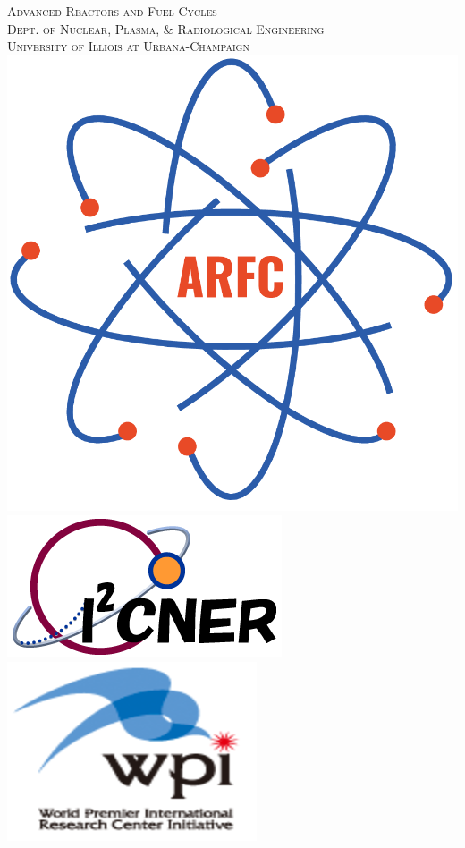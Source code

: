 \documentclass[14pt,a4paper]{article} %
\begin{document}
\begin{titlepage}
    \textsc{\LARGE Advanced Reactors and Fuel Cycles}\\[0.25cm] %
    
    \textsc{\large Dept. of Nuclear, Plasma, \& Radiological Engineering}\\%
    
    \textsc{\large University of Illiois at Urbana-Champaign}\\ %


    
    
    
    \vspace{0.5cm}
    \includegraphics[scale=0.2]{arfc-logo}
    \includegraphics[scale=0.3]{i2cner_logo}
    \includegraphics[scale=0.2]{wpi_logo}

\end{titlepage}
\end{document}
